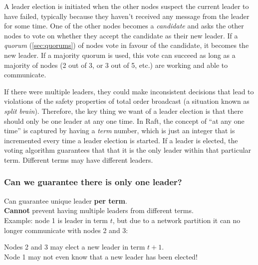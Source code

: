 A leader election is initiated when the other nodes suspect the current leader to have failed, typically because they haven't received any message from the leader for some time.
One of the other nodes becomes a \emph{candidate} and asks the other nodes to vote on whether they accept the candidate as their new leader.
If a \emph{quorum} (\autoref{sec:quorums}) of nodes vote in favour of the candidate, it becomes the new leader.
If a majority quorum is used, this vote can succeed as long as a majority of nodes (2 out of 3, or 3 out of 5, etc.) are working and able to communicate.

If there were multiple leaders, they could make inconsistent decisions that lead to violations of the safety properties of total order broadcast (a situation known as \emph{split brain}).
Therefore, the key thing we want of a leader election is that there should only be one leader at any one time.
In Raft, the concept of ``at any one time'' is captured by having a \emph{term} number, which is just an integer that is incremented every time a leader election is started.
If a leader is elected, the voting algorithm guarantees that that it is the only leader within that particular term.
Different terms may have different leaders.

\begin{frame}
    \label{s:leader-uniqueness}
    \frametitle{Can we guarantee there is only one leader?}
    Can guarantee unique leader \textbf{per term}.\\[1em]\pause
    \textbf{Cannot} prevent having multiple leaders from different terms.\\[1em]\pause
    Example: node 1 is leader in term $t$, but due to a network partition it can no longer communicate with nodes 2 and 3:
    \begin{center}
    \end{center}
    Nodes 2 and 3 may elect a new leader in term $t+1$.\\[1em]\pause
    Node 1 may not even know that a new leader has been elected!
\end{frame}
\label{l:leader-uniqueness}

